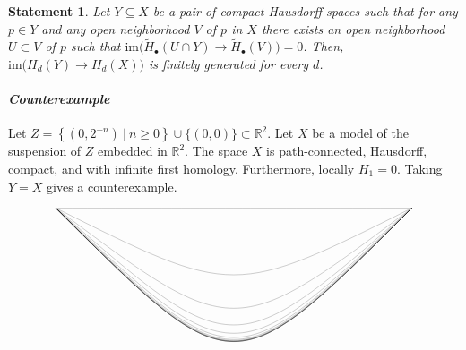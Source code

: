 \documentclass{amsart}
\newtheorem{statement}{Statement}
\newcommand{\im}{\mathrm{im}}
\newcommand{\R}{\mathbb{R}}
\begin{document}
	\begin{statement}
		Let $Y \subseteq X$ be a pair of compact Hausdorff spaces such that for any $p \in Y$ and any open neighborhood $V$ of $p$ in $X$ there exists an open neighborhood $U \subset V$ of $p$ such that $\im \big(\widetilde H_\bullet(U \cap Y) \to \widetilde H_\bullet(V)\big) = 0$. Then, $\im \big(H_d(Y) \to H_d(X)\big)$ is finitely generated for every $d$.
	\end{statement}
	\paragraph{\textit{Counterexample}} Let $Z = \left\{\left(0, 2^{-n}\right)\ |\ n \geq 0\right\} \cup \{(0, 0)\} \subset \R^2$. Let $X$ be a model of the suspension of $Z$ embedded in $\R^2$. The space $X$ is path-connected, Hausdorff, compact, and with infinite first homology. Furthermore, locally $H_1 = 0$. Taking $Y = X$ gives a counterexample.
	
	\begin{equation*}
		\begin{tikzpicture}[scale=5]
		\foreach \i in {0,1,2,...,12}{
			\draw[line width=0.05mm] (-1,1) .. controls (0,1/2^\i) .. (1,1);
		}
		\end{tikzpicture}
	\end{equation*}
\end{document}

